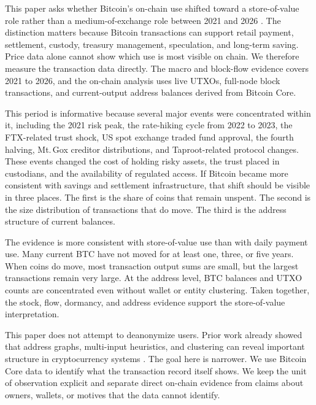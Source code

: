\documentclass[conference]{IEEEtran}
\newcommand{\btc}{Bitcoin}
\begin{document}
This paper asks whether \btc{}'s on-chain use shifted toward a
store-of-value role rather than a medium-of-exchange role between 2021 and
2026
\cite{nakamoto2008bitcoin, yermack2015bitcoin, liu2021risks,
makarov2020trading}. The distinction matters because Bitcoin transactions
can support retail payment, settlement, custody, treasury management,
speculation, and long-term saving. Price data alone
cannot show which use is most visible on chain. We therefore measure the
transaction data directly. The macro and block-flow evidence covers
2021 to 2026, and the on-chain analysis uses live UTXOs, full-node block
transactions, and current-output address balances derived from Bitcoin Core.

This period is informative because several major events were concentrated
within it, including the 2021 risk peak, the rate-hiking cycle from 2022 to
2023, the FTX-related trust shock, US spot exchange traded fund approval, the
fourth halving, Mt.\,Gox creditor distributions, and Taproot-related protocol
changes. These events changed the cost of holding risky assets, the trust
placed in custodians, and the availability of regulated access. If \btc{}
became more consistent with savings and settlement infrastructure, that
shift should be visible in three places. The first is the share of coins
that remain unspent. The second is the size distribution of transactions
that do move. The third is the address structure of current balances.

The evidence is more consistent with store-of-value use than with daily
payment use. Many current BTC have not moved for at least one, three, or
five years. When coins do move, most transaction output sums are small, but
the largest transactions remain very large. At the address level, BTC
balances and UTXO counts are concentrated even without wallet or entity
clustering. Taken together, the stock, flow, dormancy, and address evidence
support the store-of-value interpretation.

This paper does not attempt to deanonymize users. Prior work already showed
that address graphs, multi-input heuristics, and clustering can reveal
important structure in cryptocurrency systems
\cite{meiklejohn2013fistful, reid2013analysis, androulaki2013evaluating,
harrigan2016unreasonable, goldfeder2018cookie}. The goal here is narrower.
We use Bitcoin Core data to identify what the transaction record itself
shows. We keep the unit of observation explicit and separate direct on-chain
evidence from claims about owners, wallets, or motives that the data cannot
identify.
\end{document}
